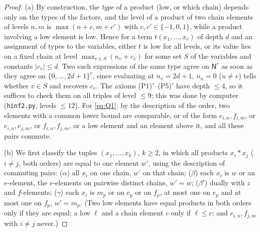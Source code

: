 \documentclass[11pt]{amsart}
\theoremstyle{definition}
\newcommand{\N}{\mathsf{N}}
\begin{document}
\begin{proof}
(a) By construction, the \emph{type} of a product (low, or which chain) depends only on the types of the factors, and the level of a product of two chain elements of levels $n,m$ is $\max(n+c,m+c')$ with $c,c'\in\{-1,0,1\}$, while a product involving a low element is low. Hence for a term $t(x_1,\dots,x_r)$ of depth $d$ and an assignment of types to the variables, either $t$ is low for all levels, or its value lies on a fixed chain at level $\max_{v\in S}(n_v+c_v)$ for some set $S$ of the variables and constants $|c_v|\le d$. Two such expressions of the same type agree on $\N^r$ as soon as they agree on $\{0,\dots,2d+1\}^r$, since evaluating at $n_v=2d+1$, $n_u=0$ ($u\ne v$) tells whether $v\in S$ and recovers $c_v$. The axioms (P1)$'$--(P5)$'$ have depth $\le4$, so it suffices to check them on all triples of level $\le9$; this was done by computer (\texttt{hinf2.py}, levels $\le12$). For \eqref{eq:Q1}: by the description of the order, two elements with a common lower bound are comparable, or of the form $e_{i,n},f_{i,m}$, or $e_{i,n},e_{j,m}$, or $f_{i,n},f_{j,m}$, or a low element and an element above it, and all these pairs commute.

(b) We first classify the tuples $(x_1,\dots,x_k)$, $k\ge2$, in which all products $x_i*x_j$ ($i\ne j$, both orders) are equal to one element $w'$, using the description of commuting pairs: ($\alpha$) all $x_i$ on one chain, $w'$ on that chain; ($\beta$) each $x_i$ is $w$ or an $e$-element, the $e$-elements on pairwise distinct chains, $w'=w$; ($\beta'$) dually with $z$ and $f$-elements; ($\gamma$) each $x_i$ is $m_p$ or on $e_p$ or on $f_p$, at most one on $e_p$ and at most one on $f_p$, $w'=m_p$. (Two low elements have equal products in both orders only if they are equal; a low $\ell$ and a chain element $c$ only if $\ell\le c$; and $e_{i,n},f_{j,m}$ with $i\ne j$ never.)


\end{proof}
\end{document}
